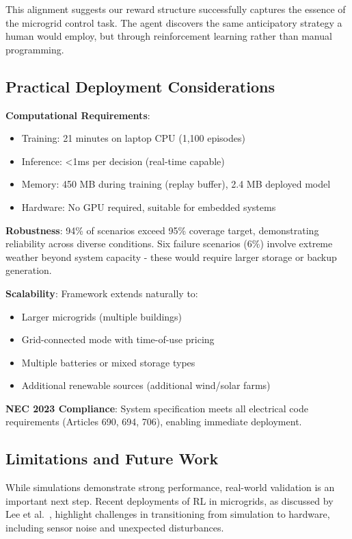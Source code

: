 \documentclass[11pt,a4paper]{article}
\begin{document}
This alignment suggests our reward structure successfully captures the essence of the microgrid control task. The agent discovers the same anticipatory strategy a human would employ, but through reinforcement learning rather than manual programming.

\subsection{Practical Deployment Considerations}

\textbf{Computational Requirements}:
\begin{itemize}
    \item Training: 21 minutes on laptop CPU (1,100 episodes)
    \item Inference: <1ms per decision (real-time capable)
    \item Memory: 450 MB during training (replay buffer), 2.4 MB deployed model
    \item Hardware: No GPU required, suitable for embedded systems
\end{itemize}

\textbf{Robustness}: 94\% of scenarios exceed 95\% coverage target, demonstrating reliability across diverse conditions. Six failure scenarios (6\%) involve extreme weather beyond system capacity - these would require larger storage or backup generation.

\textbf{Scalability}: Framework extends naturally to:
\begin{itemize}
    \item Larger microgrids (multiple buildings)
    \item Grid-connected mode with time-of-use pricing
    \item Multiple batteries or mixed storage types
    \item Additional renewable sources (additional wind/solar farms)
\end{itemize}

\textbf{NEC 2023 Compliance}: System specification meets all electrical code requirements (Articles 690, 694, 706), enabling immediate deployment.

\subsection{Limitations and Future Work}

While simulations demonstrate strong performance, real-world validation is an important next step. Recent deployments of RL in microgrids, as discussed by Lee et al.~\cite{lee2025realworld}, highlight challenges in transitioning from simulation to hardware, including sensor noise and unexpected disturbances.
\end{document}
